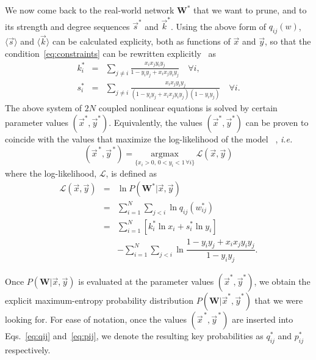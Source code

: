 \documentclass[aps,twocolumn,superscriptaddress]{revtex4-1}
\newcommand{\ie}{\emph{i.e.} }
\newcommand{\xxi}{x_i}
\newcommand{\xxj}{x_j}
\newcommand{\yyi}{y_i}
\newcommand{\yyj}{y_j}
\begin{document}
We now come back to the real-world network ${\bm W}^{\ast}$ that we want to prune, and to its strength and degree sequences $\vec{s}^{\ast}$ and $\vec{k}^\ast$. 
Using the above form of $q_{ij}(w)$, $\langle \vec{s}\rangle$ and $\langle \vec{k}\rangle$ can be calculated explicity, both as functions of $\vec{x}$ and $\vec{y}$, so that the condition~\eqref{eq:constraints} can be rewritten explicitly~\cite{mastrandrea-njp-2014,squartini-njp-2015} as
\begin{eqnarray}
k^{\ast}_i&=&\sum_{j\ne i}\frac{\xxi \xxj \yyi \yyj}{1 - \yyi \yyj + \xxi \xxj \yyi \yyj}\quad\forall i,\label{eq:k}\\
s_i^{\ast}&=&\sum_{j\ne i}\frac{\xxi \xxj \yyi \yyj}{(1 - \yyi \yyj + \xxi \xxj \yyi \yyj)(1-y_iy_j)}\quad\forall i.\label{eq:s}
\end{eqnarray}
The above system of $2N$ coupled nonlinear equations is solved by certain parameter values $(\vec{x}^{\ast},\vec{y}^{\ast})$. 
Equivalently, the values $(\vec{x}^{\ast},\vec{y}^{\ast})$ can be proven to coincide with the values that maximize the log-likelihood of the model ~\cite{mymaxlikelihood,squartini-njp-2011,squartini-njp-2015}, \ie
\begin{equation}
(\vec{x}^{\,\ast}, \vec{y}^{\,\ast})=\underset{\{x_i>0,\, 0<y_i<1\,\forall i\}}{\mathrm{argmax}}\,\mathcal{L}(\vec{x},\vec{y})
\label{eq:ML}
\end{equation}
where the log-likelihood, $\mathcal{L}$, is defined as
\begin{eqnarray}
\mathcal{L}(\vec{x},\vec{y}) &=&  \ln P(\bm{W^{\ast}} | \vec{x},\vec{y}) \,\label{eq:LL}\\
&=&\sum_{i=1}^N \sum_{j<i} \ln q_{ij}(w^{\ast}_{ij})\nonumber\\
&=&\sum_{i=1}^{N}\left[ k_i^\ast\ln x_i + s_i ^\ast\ln y_i\right]\nonumber\\
&&-\sum_{i=1}^N\sum_{j<i}\ln \dfrac{1 - y_i y_j + x_i x_j y_i y_j}{1 - y_i y_j}.\nonumber
\end{eqnarray}

Once $P(\bm{W}|\vec{x},\vec{y})$ is evaluated at the parameter values $(\vec{x}^{\ast},\vec{y}^{\ast})$, we obtain the explicit maximum-entropy probability distribution $P(\bm{W}|\vec{x}^{\ast},\vec{y}^{\ast})$ that we were looking for. 
For ease of notation, once the values $( \vec{x}^{\,\ast}, \vec{y}^{\,\ast})$ are inserted into Eqs.~\eqref{eq:qij} and~\eqref{eq:pij}, we denote the resulting key probabilities as $q^\ast_{ij}$ and $p^\ast_{ij}$ respectively.
\end{document}
